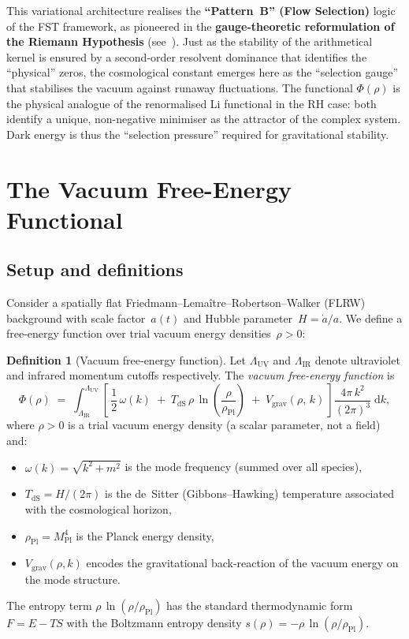 \documentclass[12pt,a4paper]{article}
\theoremstyle{definition}
\newtheorem{definition}{Definition}[section]
\theoremstyle{plain}
\theoremstyle{remark}
\newcommand{\LUV}{\Lambda_{\mathrm{UV}}}
\newcommand{\LIR}{\Lambda_{\mathrm{IR}}}
\newcommand{\dd}{\mathrm{d}}
\begin{document}
This variational architecture realises the \textbf{``Pattern~B'' (Flow Selection)} logic of the FST framework, as pioneered in the \textbf{gauge-theoretic reformulation of the Riemann Hypothesis} (see~\cite{GeigerRH2026c}). Just as the stability of the arithmetical kernel is ensured by a second-order resolvent dominance that identifies the ``physical'' zeros, the cosmological constant emerges here as the ``selection gauge'' that stabilises the vacuum against runaway fluctuations. The functional $\Phi(\rho)$ is the physical analogue of the renormalised Li functional in the RH case: both identify a unique, non-negative minimiser as the attractor of the complex system. Dark energy is thus the ``selection pressure'' required for gravitational stability.

\section{The Vacuum Free-Energy Functional}\label{sec:functional}

\subsection{Setup and definitions}

Consider a spatially flat Friedmann--Lema\^itre--Robertson--Walker (FLRW)
background with scale factor~$a(t)$ and Hubble parameter~$H = \dot{a}/a$.
We define a free-energy function over trial vacuum energy
densities~$\rho > 0$:

\begin{definition}[Vacuum free-energy function]\label{def:functional}
Let $\LUV$ and $\LIR$ denote ultraviolet and infrared momentum cutoffs
respectively. The \emph{vacuum free-energy function} is
\begin{equation}\label{eq:Phi}
  \Phi(\rho) \;=\; \int_{\LIR}^{\LUV}
    \left[\,
      \frac{1}{2}\,\omega(k)\;+\;
      T_{\mathrm{dS}}\,\rho\,\ln\!\left(\frac{\rho}{\rho_{\mathrm{Pl}}}\right)
      \;+\; V_{\mathrm{grav}}(\rho,\,k)
    \,\right]
    \frac{4\pi\,k^{2}}{(2\pi)^{3}}\;\dd k,
\end{equation}
where $\rho > 0$ is a trial vacuum energy density (a scalar parameter, not a field) and:
\begin{itemize}
  \item $\omega(k) = \sqrt{k^{2} + m^{2}}$ is the mode frequency (summed
        over all species),
  \item $T_{\mathrm{dS}} = H/(2\pi)$ is the de~Sitter (Gibbons--Hawking)
        temperature associated with the cosmological horizon,
  \item $\rho_{\mathrm{Pl}} = M_{\mathrm{Pl}}^{4}$ is the Planck
        energy density,
  \item $V_{\mathrm{grav}}(\rho,k)$ encodes the gravitational
        back-reaction of the vacuum energy on the mode structure.
\end{itemize}
The entropy term $\rho\,\ln(\rho/\rho_{\mathrm{Pl}})$ has the standard thermodynamic form $F = E - TS$ with
the Boltzmann entropy density $s(\rho) = -\rho\,\ln(\rho/\rho_{\mathrm{Pl}})$.
\end{definition}
\end{document}
